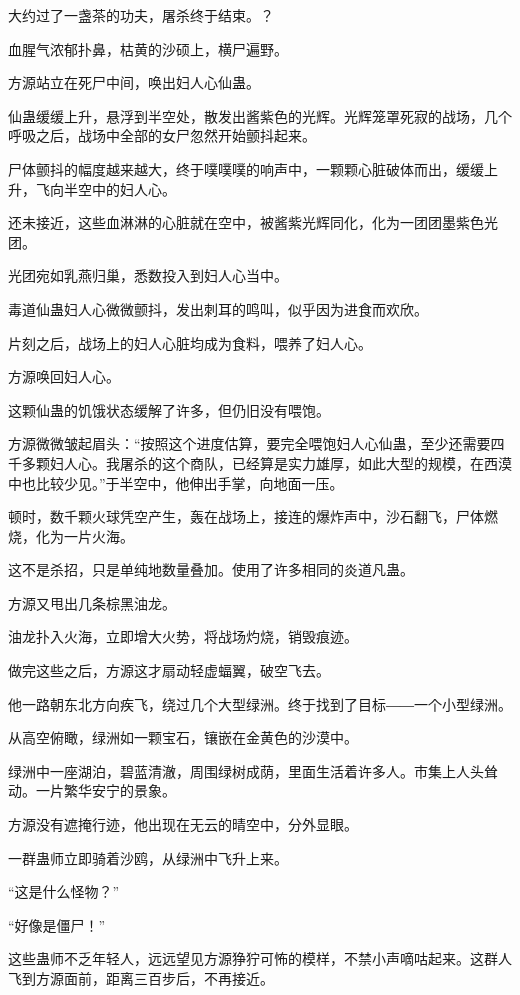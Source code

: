 
\begin{this_body}

大约过了一盏茶的功夫，屠杀终于结束。？

血腥气浓郁扑鼻，枯黄的沙硕上，横尸遍野。

方源站立在死尸中间，唤出妇人心仙蛊。

仙蛊缓缓上升，悬浮到半空处，散发出酱紫色的光辉。光辉笼罩死寂的战场，几个呼吸之后，战场中全部的女尸忽然开始颤抖起来。

尸体颤抖的幅度越来越大，终于噗噗噗的响声中，一颗颗心脏破体而出，缓缓上升，飞向半空中的妇人心。

还未接近，这些血淋淋的心脏就在空中，被酱紫光辉同化，化为一团团墨紫色光团。

光团宛如乳燕归巢，悉数投入到妇人心当中。

毒道仙蛊妇人心微微颤抖，发出刺耳的鸣叫，似乎因为进食而欢欣。

片刻之后，战场上的妇人心脏均成为食料，喂养了妇人心。

方源唤回妇人心。

这颗仙蛊的饥饿状态缓解了许多，但仍旧没有喂饱。

方源微微皱起眉头：“按照这个进度估算，要完全喂饱妇人心仙蛊，至少还需要四千多颗妇人心。我屠杀的这个商队，已经算是实力雄厚，如此大型的规模，在西漠中也比较少见。”于半空中，他伸出手掌，向地面一压。

顿时，数千颗火球凭空产生，轰在战场上，接连的爆炸声中，沙石翻飞，尸体燃烧，化为一片火海。

这不是杀招，只是单纯地数量叠加。使用了许多相同的炎道凡蛊。

方源又甩出几条棕黑油龙。

油龙扑入火海，立即增大火势，将战场灼烧，销毁痕迹。

做完这些之后，方源这才扇动轻虚蝠翼，破空飞去。

他一路朝东北方向疾飞，绕过几个大型绿洲。终于找到了目标――一个小型绿洲。

从高空俯瞰，绿洲如一颗宝石，镶嵌在金黄色的沙漠中。

绿洲中一座湖泊，碧蓝清澈，周围绿树成荫，里面生活着许多人。市集上人头耸动。一片繁华安宁的景象。

方源没有遮掩行迹，他出现在无云的晴空中，分外显眼。

一群蛊师立即骑着沙鸥，从绿洲中飞升上来。

“这是什么怪物？”

“好像是僵尸！”

这些蛊师不乏年轻人，远远望见方源狰狞可怖的模样，不禁小声嘀咕起来。这群人飞到方源面前，距离三百步后，不再接近。


\end{this_body}
